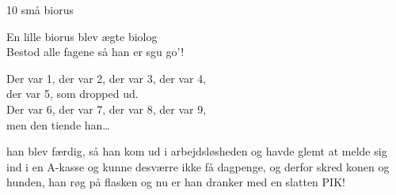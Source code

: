 \begin{song}{10 små biorus}{}
  \begin{SBVerse}
  En lille biorus blev ægte biolog\\
  Bestod alle fagene så han er sgu go'!
  \end{SBVerse}

  \begin{SBChorus}
  Der var 1, der var 2, der var 3, der var 4,\\
  der var 5, som dropped ud.\\
  Der var 6, der var 7, der var 8, der var 9,\\
  men den tiende han\ldots
  \end{SBChorus}

  han blev færdig, så han kom ud i arbejdsløsheden og havde glemt at melde sig ind i en A-kasse og kunne desværre ikke få dagpenge, og derfor skred konen og hunden, han røg på flasken og nu er han dranker med en slatten PIK!

\end{song}